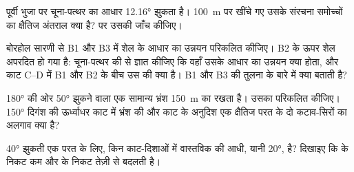 \begin{exercise}[$\star\star$]\label{exo:b1:cross-sections:7}
पूर्वी भुजा पर चूना-पत्थर का आधार \ang{12.16} झुकता है। \qty{100}{m} पर खींचे गए उसके संरचना समोच्चों का क्षैतिज
अंतराल क्या है?  पर उसकी जाँच कीजिए।
\end{exercise}

\begin{exercise}[$\star\star$]\label{exo:b1:cross-sections:8}
बोरहोल सारणी से B1 और B3 में शेल के आधार का उन्नयन परिकलित कीजिए। B2 के ऊपर शेल अपरदित हो गया है: चूना-पत्थर की
 से ज्ञात कीजिए कि वहाँ उसके आधार का उन्नयन क्या होता, और काट C--D में B1 और B2 के बीच उस  की
 क्या है। B1 और B3 की तुलना  के बारे में क्या बताती है?
\end{exercise}

\begin{exercise}[$\star\star$]\label{exo:b1:cross-sections:9}
\ang{180} की ओर \ang{50} झुकने वाला एक सामान्य भ्रंश \qty{150}{m} का  रखता है। उसका 
परिकलित कीजिए। \ang{150} दिगंश की ऊर्ध्वाधर काट में भ्रंश की  और काट के अनुदिश एक क्षैतिज परत के दो
कटाव-सिरों का अलगाव क्या है?
\end{exercise}

\begin{exercise}[$\star\star\star$]\label{exo:b1:cross-sections:10}
\ang{40} झुकती एक परत के लिए, किन काट-दिशाओं में  वास्तविक  की आधी, यानी \ang{20}, है? दिखाइए कि
  के निकट कम और  के निकट तेज़ी से बदलती है।
\end{exercise}

